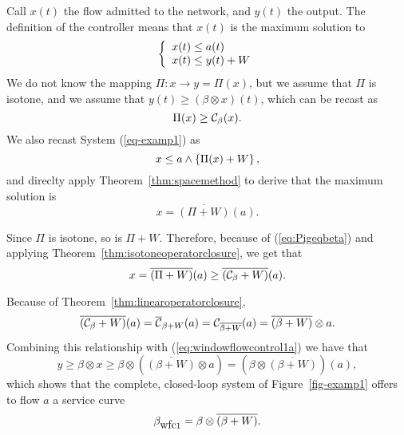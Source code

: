 \begin{figure}[!h]
    \protect{}
\end{figure}

Call $x(t)$ the flow admitted to the network, and $y(t)$ the output. The definition of the controller means that $x(t)$ is the maximum solution to
 \begin{equation}
    \left \{
    \begin{array}{l}
          x(t) \leq a(t) \\
          x(t) \leq y(t) + W
    \end{array}
    \right.
    \mylabel{eq-examp1}
 \end{equation}
We do not know the mapping $\Pi : x  \rightarrow y = \Pi(x)$, but we assume that $\Pi$ is isotone, and we assume that
$ y(t) \geq (\beta \otimes x)(t)$, which can be recast as
\begin{equation}
\mylabel{eq:Pigeqbeta}
\Pi(x) \geq \calC_\beta(x).
\end{equation}
We also recast System (\ref{eq-examp1}) as
\begin{equation}
\mylabel{eq:windowflowcontrol1}
x \leq a \wedge \left\{ \Pi(x) + W \right\},
\end{equation}
and direclty apply Theorem~\ref{thm:spacemethod} to derive that the maximum solution is
$$ x = \overline{ (\Pi + W) } (a). $$

Since $\Pi$ is isotone, so is $\Pi + W$. Therefore, because of (\ref{eq:Pigeqbeta}) and
 applying Theorem~\ref{thm:isotoneoperatorclosure}, we get that
\begin{equation}
\mylabel{eq:windowflowcontrol1a}
 x = \overline{ (\Pi + W) } (a) \geq \overline{ (\calC_\beta + W) }(a) .
\end{equation}

Because of Theorem~\ref{thm:linearoperatorclosure},
$$  \overline{ (\mathcal C_\beta + W) }(a)  =  \overline{ \mathcal C}_{\beta + W }(a)  = \mathcal C_{\overline{\beta + W }}(a) =  \overline{(\beta + W)} \otimes a. $$
Combining this relationship with (\ref{eq:windowflowcontrol1a}) we have that
$$ y \geq \beta \otimes x \geq \beta \otimes \left( \overline{(\beta + W)} \otimes a \right) = \left( \beta \otimes \overline{(\beta + W)} \right) (a), $$
which shows that the complete, closed-loop system of Figure~\ref{fig-examp1} offers to
flow $a $ a service curve \cite{cha96}
\begin{equation}
\mylabel{eq:servicecurvetrafficcontrol1}
\beta_{\mbox{wfc}1} = \beta \otimes \overline{(\beta + W)}.
\end{equation}

